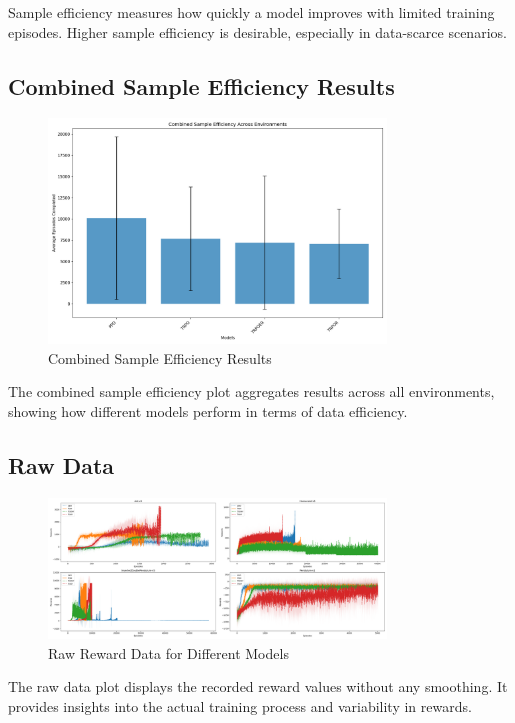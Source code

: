 \documentclass{svproc}
\begin{document}
Sample efficiency measures how quickly a model improves with limited training episodes. Higher sample efficiency is desirable, especially in data-scarce scenarios.

\subsection{Combined Sample Efficiency Results}

\begin{figure}[H]
    \centering
    \includegraphics[width=0.8\textwidth]{.assets/sample_efficiency_combined.png}
    \caption{Combined Sample Efficiency Results}
\end{figure}

The combined sample efficiency plot aggregates results across all environments, showing how different models perform in terms of data efficiency.

\subsection{Raw Data}

\begin{figure}[H]
    \centering
    \includegraphics[width=0.8\textwidth]{.assets/raw_data.png}
    \caption{Raw Reward Data for Different Models}
\end{figure}

The raw data plot displays the recorded reward values without any smoothing. It provides insights into the actual training process and variability in rewards.

\newpage



\end{document}

